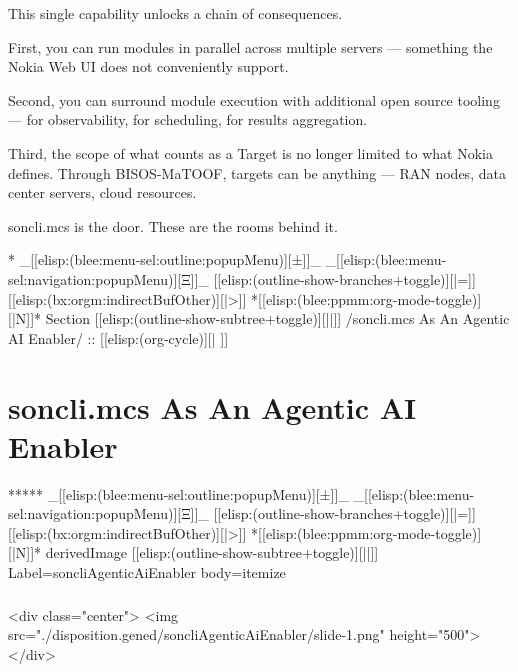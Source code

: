 \begin{verblatex}
\begin{frame}[fragile,plain,label=soncliBenefits]
{  This single capability unlocks a chain of consequences.

  First, you can run modules in parallel across multiple servers --- something
  the Nokia Web UI does not conveniently support.

  Second, you can surround module execution with additional open source tooling ---
  for observability, for scheduling, for results aggregation.

  Third, the scope of what counts as a Target is no longer limited to what Nokia
  defines. Through BISOS-MaTOOF, targets can be anything --- RAN nodes, data
  center servers, cloud resources.

  soncli.mcs is the door. These are the rooms behind it.
}

\end{frame}
\end{verblatex}


\begin{whenOrg}
*  _[[elisp:(blee:menu-sel:outline:popupMenu)][±]]_ _[[elisp:(blee:menu-sel:navigation:popupMenu)][Ξ]]_ [[elisp:(outline-show-branches+toggle)][|=]] [[elisp:(bx:orgm:indirectBufOther)][|>]] *[[elisp:(blee:ppmm:org-mode-toggle)][|N]]*  Section    [[elisp:(outline-show-subtree+toggle)][||]]   /soncli.mcs As An Agentic AI Enabler/ ::  [[elisp:(org-cycle)][| ]]
\end{whenOrg}

\section{soncli.mcs As An Agentic AI Enabler}


\begin{whenOrg}
*****  _[[elisp:(blee:menu-sel:outline:popupMenu)][±]]_ _[[elisp:(blee:menu-sel:navigation:popupMenu)][Ξ]]_ [[elisp:(outline-show-branches+toggle)][|=]] [[elisp:(bx:orgm:indirectBufOther)][|>]] *[[elisp:(blee:ppmm:org-mode-toggle)][|N]]*  derivedImage [[elisp:(outline-show-subtree+toggle)][||]] Label=soncliAgenticAiEnabler  body=itemize
\end{whenOrg}

\begin{htmlonly}

\begin{frame}[fragile,plain,label=soncliAgenticAiEnabler]
    \frametitle{}
    \framesubtitle{}
    \begin{rawhtml}
<div class="center">
<img src="./disposition.gened/soncliAgenticAiEnabler/slide-1.png" height="500">
</div>
    \end{rawhtml}
\end{frame}
\end{htmlonly}

